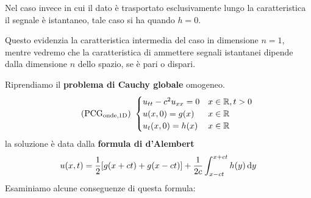 Nel caso invece in cui il dato è trasportato esclusivamente lungo la caratteristica il segnale è istantaneo, tale caso si ha quando $h=0$.

Questo evidenzia la caratteristica intermedia del caso in dimensione $n=1$, mentre vedremo che la caratteristica di ammettere segnali istantanei dipende dalla dimensione $n$ dello spazio, se è pari o dispari.


Riprendiamo il \textbf{problema di Cauchy globale} omogeneo.
\begin{equation}
    \tag{PCG$_{\text{onde,1D}}$} \
    \begin{cases}
        u_{tt} -c^{2} u_{xx} =0 & x\in \mathbb{R} ,t >0 \\
        u(x,0) =g(x)            & x\in \mathbb{R}       \\
        u_{t}(x,0) =h(x)        & x\in \mathbb{R}
    \end{cases}
    \label{eq:pcg-onde-1d}
\end{equation}
la soluzione è data dalla \textbf{formula di d'Alembert}
\begin{equation}
    u(x,t) =\frac{1}{2}[ g(x+ct) +g(x-ct)] +\frac{1}{2c}\int _{x-ct}^{x+ct} h(y) \,\mathrm d y
    \label{eq:onde-formula-di-dAlembert}
\end{equation}
Esaminiamo alcune conseguenze di questa formula:
